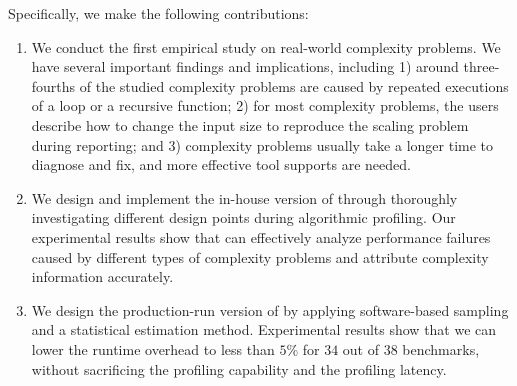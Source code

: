 Specifically, we make the following contributions:

\begin{enumerate}

\item We conduct the first empirical study on real-world complexity problems.
We have several important findings and implications, including
1) around three-fourths of the studied complexity problems are
caused by repeated executions of a loop or a recursive function;
2) for most complexity problems,
the users describe how to change the input size to reproduce the scaling problem during reporting;
and 3) complexity problems usually take a longer time to diagnose and fix,
and more effective tool supports are needed.

\item We design and implement the in-house version of \Tool through
thoroughly investigating different design points during algorithmic profiling.
Our experimental results show that \Tool can effectively analyze performance failures
caused by different types of complexity problems and attribute complexity information accurately.

\fi

\item We design the production-run version of \Tool by applying
software-based sampling and a statistical estimation method.
Experimental results show that we can lower the runtime overhead to less than
$5\%$ for $34$ out of $38$ benchmarks,
without sacrificing the profiling capability and the profiling latency.

\end{enumerate}
